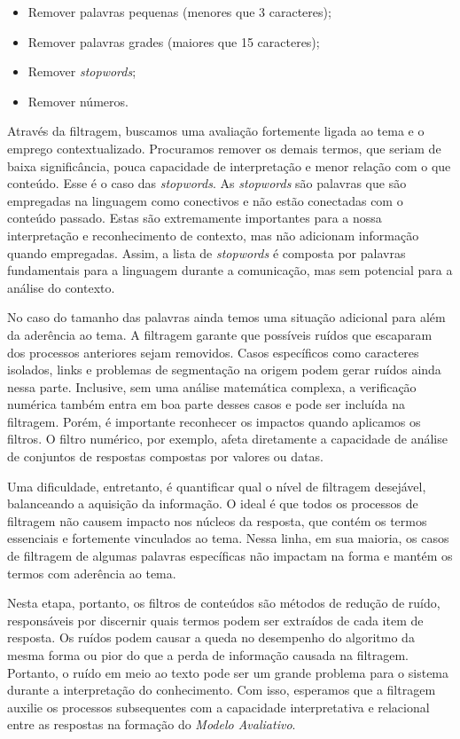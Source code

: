 \begin{itemize}
	\item Remover palavras pequenas (menores que 3 caracteres);
	\item Remover palavras grades (maiores que 15 caracteres);
	\item Remover \textit{stopwords};
	\item Remover números.
\end{itemize}

Através da filtragem, buscamos uma avaliação fortemente ligada ao tema e o emprego contextualizado. Procuramos remover os demais termos, que seriam de baixa significância, pouca capacidade de interpretação e menor relação com o que conteúdo. Esse é o caso das \textit{stopwords}. As \textit{stopwords} são palavras que são empregadas na linguagem como conectivos e não estão conectadas com o conteúdo passado. Estas são extremamente importantes para a nossa interpretação e reconhecimento de contexto, mas não adicionam informação quando empregadas. Assim, a lista de \textit{stopwords} é composta por palavras fundamentais para a linguagem durante a comunicação, mas sem potencial para a análise do contexto.

No caso do tamanho das palavras ainda temos uma situação adicional para além da aderência ao tema. A filtragem garante que possíveis ruídos que escaparam dos processos anteriores sejam removidos. Casos específicos como caracteres isolados, links e problemas de segmentação na origem podem gerar ruídos ainda nessa parte. Inclusive, sem uma análise matemática complexa, a verificação numérica também entra em boa parte desses casos e pode ser incluída na filtragem. Porém, é importante reconhecer os impactos quando aplicamos os filtros. O filtro numérico, por exemplo, afeta diretamente a capacidade de análise de conjuntos de respostas compostas por valores ou datas. 

Uma dificuldade, entretanto, é quantificar qual o nível de filtragem desejável, balanceando a aquisição da informação. O ideal é que todos os processos de filtragem não causem impacto nos núcleos da resposta, que contém os termos essenciais e fortemente vinculados ao tema. Nessa linha, em sua maioria, os casos de filtragem de algumas palavras específicas não impactam na forma e mantém os termos com aderência ao tema.

Nesta etapa, portanto, os filtros de conteúdos são métodos de redução de ruído, responsáveis por discernir quais termos podem ser extraídos de cada item de resposta. Os ruídos podem causar a queda no desempenho do algoritmo da mesma forma ou pior do que a perda de informação causada na filtragem. Portanto, o ruído em meio ao texto pode ser um grande problema para o sistema durante a interpretação do conhecimento. Com isso, esperamos que a filtragem auxilie os processos subsequentes com a capacidade interpretativa e relacional entre as respostas na formação do \textit{Modelo Avaliativo}.


